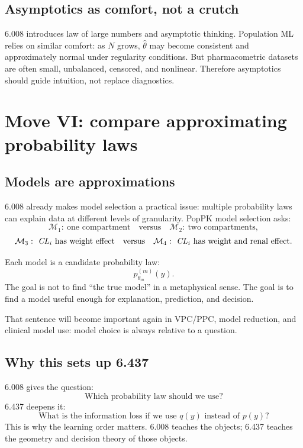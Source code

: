 \documentclass[a4paper]{article}
\begin{document}
\subsection{Asymptotics as comfort, not a crutch}

6.008 introduces law of large numbers and asymptotic thinking. Population ML relies on similar comfort: as \(N\) grows, \(\widehat\theta\) may become consistent and approximately normal under regularity conditions. But pharmacometric datasets are often small, unbalanced, censored, and nonlinear. Therefore asymptotics should guide intuition, not replace diagnostics.

\section{Move VI: compare approximating probability laws}

\subsection{Models are approximations}

6.008 already makes model selection a practical issue: multiple probability laws can explain data at different levels of granularity. PopPK model selection asks:
\[
  \mathcal{M}_1:\ \text{one compartment}
  \quad \text{versus} \quad
  \mathcal{M}_2:\ \text{two compartments},
\]
\[
  \mathcal{M}_3:\ \pksym{CL}_i \text{ has weight effect}
  \quad \text{versus} \quad
  \mathcal{M}_4:\ \pksym{CL}_i \text{ has weight and renal effect}.
\]

Each model is a candidate probability law:
\[
  p_{\theta_m}^{(m)}(y).
\]
The goal is not to find ``the true model'' in a metaphysical sense. The goal is to find a model useful enough for explanation, prediction, and decision.

That sentence will become important again in VPC/PPC, model reduction, and clinical model use: model choice is always relative to a question.

\subsection{Why this sets up 6.437}

6.008 gives the question:
\[
  \text{Which probability law should we use?}
\]
6.437 deepens it:
\[
  \text{What is the information loss if we use } q(y) \text{ instead of } p(y)?
\]
This is why the learning order matters. 6.008 teaches the objects; 6.437 teaches the geometry and decision theory of those objects.
\end{document}
